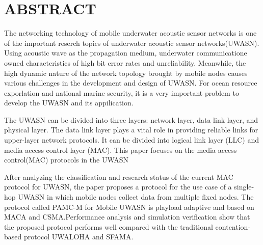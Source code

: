 \renewcommand{\baselinestretch}{1.5}
\fontsize{12pt}{13pt}\selectfont

\chapter[ABSTRACT(英文摘要)]{ABSTRACT}
The networking technology of mobile underwater acoustic sensor networks is one of the important reserch topics of underwater acoustic sensor networks(UWASN). Using acoustic wave as the propagation medium, underwater communicatione owned characteristics of high bit error rates and unreliability. Meanwhile, the high dynamic nature of the network topology brought by mobile nodes causes various challenges in the development and design of UWASN. For ocean resource exporlation and national marine security, it is a very important problem to develop the UWASN and its appilication.

The UWASN can be divided into three layers: network layer, data link layer, and physical layer. The data link layer plays a vital role in providing reliable links for upper-layer network protocols. It can be divided into logical link layer (LLC) and media access control layer (MAC). This paper focuses on the  media access control(MAC) protocols in the UWASN

After analyzing the classification and research status of the current MAC protocol for UWASN, the paper proposes a protocol for the use case of a single-hop UWASN in which mobile nodes collect data from multiple fixed nodes.
The protocol called PAMC-M for Mobile UWASN is playload adaptive and based on MACA and CSMA.Performance analysis and simulation verification show that the proposed protocol performs well compared with the traditional contention-based protocol UWALOHA and SFAMA.

